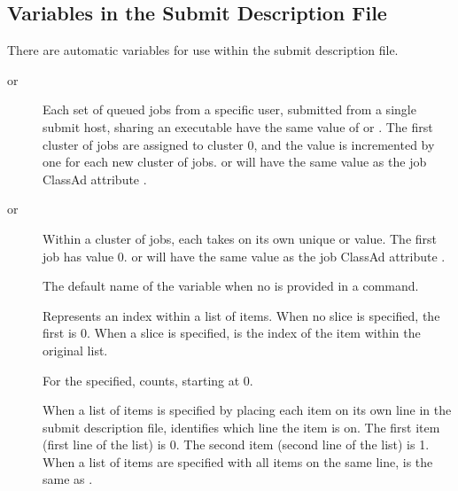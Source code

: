 \subsection{\label{sec:user-man-submit-variables}Variables in the Submit Description File}
There are automatic variables for use within the submit description file.

\begin{description}

\item [ or ]
  Each set of queued jobs from a specific user, 
  submitted from a single submit host, sharing an executable
  have the same value of  or .
  The first cluster of jobs are assigned to cluster 0, 
  and the value is incremented by one for each new cluster of jobs.
   or  will have the same value as the job ClassAd attribute
  .
\item [ or ]
  Within a cluster of jobs, each takes on its own unique  
  or  value.
  The first job has value 0.
   or  will have the same value as the 
  job ClassAd attribute .
\item []
  The default name of the variable when no  is provided
  in a  command.
\item []
  Represents an index within a list of items.  
  When no slice is specified, the first  is 0.
  When a slice is specified,  is the index of the
  item within the original list.
\item []
  For the  specified,
   counts, starting at 0.
\item []
  When a list of items is specified by placing each item on its own line
  in the submit description file,
   identifies which line the item is on.
  The first item (first line of the list) is  0.
  The second item (second line of the list) is  1.
  When a list of items are specified with all items on the same line,
   is the same as .

\end{description}

